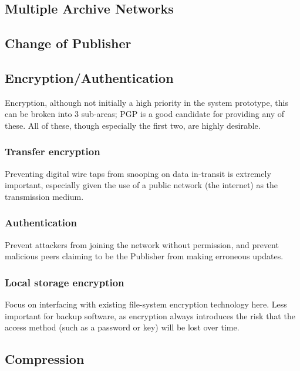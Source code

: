 \documentclass[12pt,a4paper,]{adreport}
\begin{document}
\subsection{Multiple Archive Networks}\label{multiple-archive-networks}

\subsection{Change of Publisher}\label{change-of-publisher}

\subsection{Encryption/Authentication}\label{encryptionauthentication}

Encryption, although not initially a high priority in the system
prototype, this can be broken into 3 sub-areas; PGP is a good candidate
for providing any of these. All of these, though especially the first
two, are highly desirable.

\subsubsection{Transfer encryption}\label{transfer-encryption}

Preventing digital wire taps from snooping on data in-transit is
extremely important, especially given the use of a public network (the
internet) as the transmission medium.

\subsubsection{Authentication}\label{authentication}

Prevent attackers from joining the network without permission, and
prevent malicious peers claiming to be the Publisher from making
erroneous updates.

\subsubsection{Local storage encryption}\label{local-storage-encryption}

Focus on interfacing with existing file-system encryption technology
here. Less important for backup software, as encryption always
introduces the risk that the access method (such as a password or key)
will be lost over time.

\subsection{Compression}\label{compression}
\end{document}
